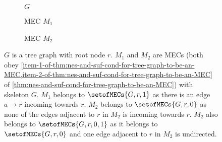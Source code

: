 \documentclass{article}
\begin{document}
\begin{figure}[h]
    \centering
    \begin{subfigure}{0.3\textwidth}
        \centering
        \caption{$G$}
    \end{subfigure}
    \hfill
    \begin{subfigure}{0.3\textwidth}
        \centering
        \caption{MEC $M_1$}
    \end{subfigure}
    \hfill
    \begin{subfigure}{0.3\textwidth}
        \centering
        \caption{MEC $M_2$}
    \end{subfigure}
    \caption{$G$ is a tree graph with root node $r$. $M_1$ and $M_2$ are MECs (both obey \cref{item-1-of-thm:nes-and-suf-cond-for-tree-graph-to-be-an-MEC,item-2-of-thm:nes-and-suf-cond-for-tree-graph-to-be-an-MEC} of \cref{thm:nes-and-suf-cond-for-tree-graph-to-be-an-MEC}) with skeleton $G$. $M_1$ belongs to $\setofMECs{G, r, 1}$ as there is an edge $a\rightarrow r$ incoming towards $r$. $M_2$ belongs to $\setofMECs{G, r, 0}$ as none of the edges adjacent to $r$ in $M_2$ is incoming towards $r$. $M_2$ also belongs to $\setofMECs{G, r, 0, 1}$ as it belongs to $\setofMECs{G, r, 0}$ and one edge adjacent to $r$ in $M_2$ is undirected.}
\end{figure}
\end{document}
